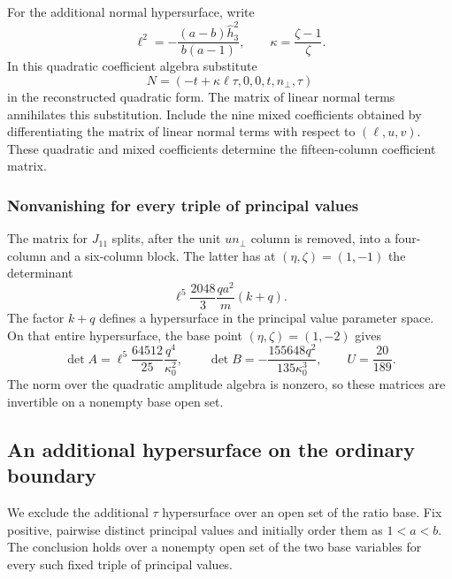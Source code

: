 \documentclass[11pt,a4paper]{article}
\numberwithin{equation}{section}
\theoremstyle{plain}
\theoremstyle{definition}
\theoremstyle{remark}
\begin{document}
For the additional normal hypersurface, write
\[
 \ell^2=-\frac{(a-b)\widehat h_3 ^2}{b(a-1)},\qquad
 \kappa=\frac{\zeta -1}{\zeta }.
\]
In this quadratic coefficient algebra substitute
\[
 N=(-t+\kappa\ell\tau,0,0,t,n_\perp,\tau)
\]
in the reconstructed quadratic form. The matrix of linear normal terms annihilates this substitution. Include the nine mixed coefficients obtained by
differentiating the matrix of linear normal terms with respect to
$(\ell,u,v)$. These quadratic and mixed coefficients determine the fifteen-column
coefficient matrix.

\subsubsection{Nonvanishing for every triple of principal values}

The matrix for $J_{11}$ splits, after the unit $un_\perp$ column is
removed, into a four-column and a six-column block. The latter has
at $(\eta ,\zeta )=(1,-1)$ the determinant
\[
 \ell^5\frac{2048}{3}\frac{qa^2}{m}(k+q).
\]
The factor $k+q$ defines a hypersurface in the principal value parameter space. On that entire
hypersurface, the base point $(\eta ,\zeta )=(1,-2)$ gives
\[
 \det A=\ell^5\frac{64512}{25}\frac{q^4}{\kappa_0 ^2},\qquad
 \det B=-\frac{155648q^2}{135\kappa_0 ^3},\qquad
 U=\frac{20}{189}.
\]
The norm over the quadratic amplitude algebra is nonzero, so these
matrices are invertible on a nonempty base open set.

\subsection{An additional hypersurface on the ordinary boundary}
\label{appr3tau:wall}

We exclude the additional $\tau$ hypersurface over an open set of the ratio base.  Fix positive, pairwise distinct principal values and initially order them as $1<a<b$.  The conclusion holds over a
nonempty open set of the two base variables for every such fixed triple of principal values.
\end{document}
